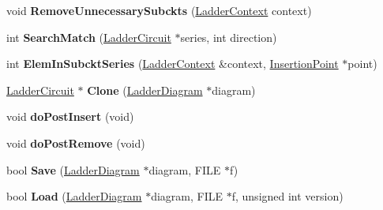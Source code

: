 \begin{DoxyCompactItemize}
\item 
\hypertarget{class_ladder_circuit_ae71ff20b64d47d1a54769eb7229ac4f1}{void {\bfseries Remove\-Unnecessary\-Subckts} (\hyperlink{struct_ladder_context}{Ladder\-Context} context)}\label{class_ladder_circuit_ae71ff20b64d47d1a54769eb7229ac4f1}

\item 
\hypertarget{class_ladder_circuit_a435604093cdd1d6e35dfb0eb146a1b94}{int {\bfseries Search\-Match} (\hyperlink{class_ladder_circuit}{Ladder\-Circuit} $\ast$series, int direction)}\label{class_ladder_circuit_a435604093cdd1d6e35dfb0eb146a1b94}

\item 
\hypertarget{class_ladder_circuit_a96141987f7c71b37a7497f15d292c314}{int {\bfseries Elem\-In\-Subckt\-Series} (\hyperlink{struct_ladder_context}{Ladder\-Context} \&context, \hyperlink{struct_insertion_point}{Insertion\-Point} $\ast$point)}\label{class_ladder_circuit_a96141987f7c71b37a7497f15d292c314}

\item 
\hypertarget{class_ladder_circuit_a53aca622fef040ead057145de34cbc2e}{\hyperlink{class_ladder_circuit}{Ladder\-Circuit} $\ast$ {\bfseries Clone} (\hyperlink{class_ladder_diagram}{Ladder\-Diagram} $\ast$diagram)}\label{class_ladder_circuit_a53aca622fef040ead057145de34cbc2e}

\item 
\hypertarget{class_ladder_circuit_a5f55b0f2c276222b77c50d8dc9a14888}{void {\bfseries do\-Post\-Insert} (void)}\label{class_ladder_circuit_a5f55b0f2c276222b77c50d8dc9a14888}

\item 
\hypertarget{class_ladder_circuit_a34770fe88f488cd9311c63d3a36014ab}{void {\bfseries do\-Post\-Remove} (void)}\label{class_ladder_circuit_a34770fe88f488cd9311c63d3a36014ab}

\item 
\hypertarget{class_ladder_circuit_a880eba756722d65f571334ae740a2717}{bool {\bfseries Save} (\hyperlink{class_ladder_diagram}{Ladder\-Diagram} $\ast$diagram, F\-I\-L\-E $\ast$f)}\label{class_ladder_circuit_a880eba756722d65f571334ae740a2717}

\item 
\hypertarget{class_ladder_circuit_a904052549d1f10a052acdd064571fb8e}{bool {\bfseries Load} (\hyperlink{class_ladder_diagram}{Ladder\-Diagram} $\ast$diagram, F\-I\-L\-E $\ast$f, unsigned int version)}\label{class_ladder_circuit_a904052549d1f10a052acdd064571fb8e}


\end{DoxyCompactItemize}
